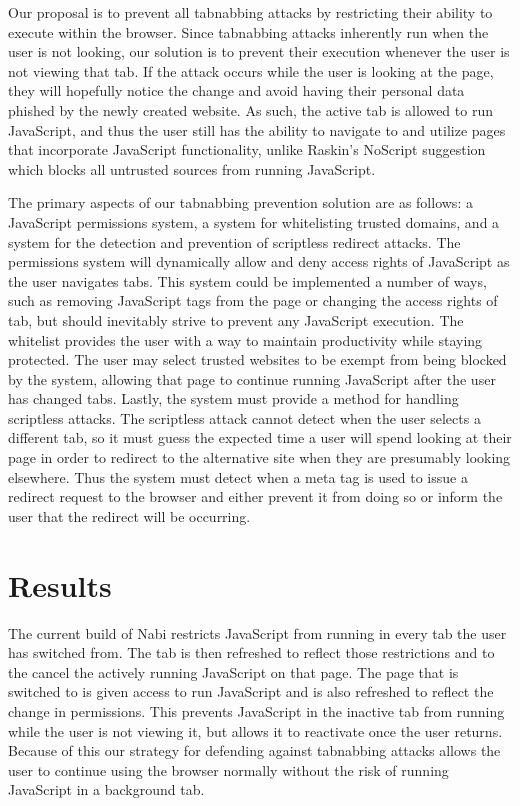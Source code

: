 \documentclass[12pt]{article}
\begin{document}
\begin{doublespace}
Our proposal is to prevent all tabnabbing attacks by restricting their ability to execute within the browser. Since tabnabbing attacks inherently run when the user is not looking, our solution is to prevent their execution whenever the user is not viewing that tab. If the attack occurs while the user is looking at the page, they will hopefully notice the change and avoid having their personal data phished by the newly created website. As such, the active tab is allowed to run JavaScript, and thus the user still has the ability to navigate to and utilize pages that incorporate JavaScript functionality, unlike Raskin's NoScript suggestion which blocks all untrusted sources from running JavaScript.

The primary aspects of our tabnabbing prevention solution are as follows: a JavaScript permissions system, a system for whitelisting trusted domains, and a system for the detection and prevention of scriptless redirect attacks. The permissions system will dynamically allow and deny access rights of JavaScript as the user navigates tabs. This system could be implemented a number of ways, such as removing JavaScript tags from the page or changing the access rights of tab, but should inevitably strive to prevent any JavaScript execution. The whitelist provides the user with a way to maintain productivity while staying protected. The user may select trusted websites to be exempt from being blocked by the system, allowing that page to continue running JavaScript after the user has changed tabs. Lastly, the system must provide a method for handling scriptless attacks. The scriptless attack cannot detect when the user selects a different tab, so it must guess the expected time a user will spend looking at their page in order to redirect to the alternative site when they are presumably looking elsewhere. Thus the system must detect when a meta tag is used to issue a redirect request to the browser and either prevent it from doing so or inform the user that the redirect will be occurring.

\section{Results}
The current build of Nabi restricts JavaScript from running in every tab the user has switched from. The tab is then refreshed to reflect those restrictions and to the cancel the actively running JavaScript on that page. The page that is switched to is given access to run JavaScript and is also refreshed to reflect the change in permissions. This prevents JavaScript in the inactive tab from running while the user is not viewing it, but allows it to reactivate once the user returns. Because of this our strategy for defending against tabnabbing attacks allows the user to continue using the browser normally without the risk of running JavaScript in a background tab.


\end{doublespace}
\end{document}
